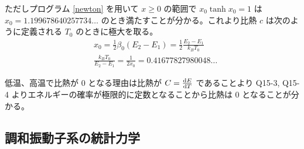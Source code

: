 \documentclass[uplatex,diffipdfmx,a4paper,11pt]{jlreq}
\numberwithin{equation}{section}
\theoremstyle{definition}
\begin{document}
ただしプログラム \ref{newton} を用いて $x\geq 0$ の範囲で $x_0\tanh x_0 = 1$ は $x_0 = 1.199678640257734\ldots$ のとき満たすことが分かる。これより比熱 $c$ は次のように定義される $T_0$ のときに極大を取る。
\begin{align}
   & x_0 = \frac{1}{2}\beta_0(E_2 - E_1) = \frac{1}{2}\frac{E_2 - E_1}{k_BT_0} \\
   & \frac{k_BT_0}{E_2 - E_1} = \frac{1}{2x_0} =  0.41677827980048\ldots
\end{align}

低温、高温で比熱が 0 となる理由は比熱が $C = \diff{E}{T}$ であることより Q15-3, Q15-4 よりエネルギーの確率が極限的に定数となることから比熱は 0 となることが分かる。

\subsection{調和振動子系の統計力学}
\end{document}
